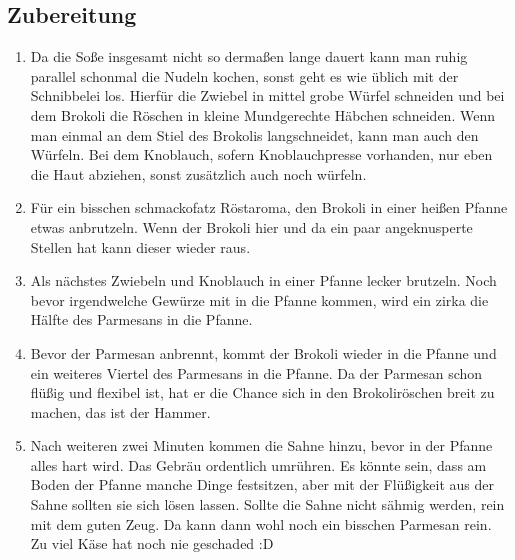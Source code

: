     \subsection*{Zubereitung}
      \begin{enumerate}
        \item Da die Soße insgesamt nicht so dermaßen lange dauert kann man
              ruhig parallel schonmal die Nudeln kochen, sonst geht es wie
              üblich mit der Schnibbelei los. Hierfür die Zwiebel in mittel
              grobe Würfel schneiden und bei dem Brokoli die Röschen in kleine
              Mundgerechte Häbchen schneiden. Wenn man einmal an dem Stiel des
              Brokolis langschneidet, kann man auch den Würfeln. Bei dem Knoblauch,
              sofern Knoblauchpresse vorhanden, nur eben die Haut abziehen,
              sonst zusätzlich auch noch würfeln.
        \item Für ein bisschen schmackofatz Röstaroma, den Brokoli in einer
              heißen Pfanne etwas anbrutzeln. Wenn der Brokoli hier und da ein
              paar angeknusperte Stellen hat kann dieser wieder raus.
        \item Als nächstes Zwiebeln und Knoblauch in einer Pfanne lecker
              brutzeln. Noch bevor irgendwelche Gewürze mit in die Pfanne
              kommen, wird ein zirka die Hälfte des Parmesans in die Pfanne.
        \item Bevor der Parmesan anbrennt, kommt der Brokoli wieder in die
              Pfanne und ein weiteres Viertel des Parmesans in die Pfanne. Da
              der Parmesan schon flüßig und flexibel ist, hat er die Chance sich
              in den Brokoliröschen breit zu machen, das ist der Hammer.
        \item Nach weiteren zwei Minuten kommen die Sahne hinzu, bevor in der
              Pfanne alles hart wird. Das Gebräu ordentlich umrühren. Es könnte
              sein, dass am Boden der Pfanne manche Dinge festsitzen, aber mit
              der Flüßigkeit aus der Sahne sollten sie sich lösen lassen. Sollte
              die Sahne nicht sähmig werden, rein mit dem guten Zeug. Da kann
              dann wohl noch ein bisschen Parmesan rein. Zu viel Käse hat noch
              nie geschaded :D
      \end{enumerate}
